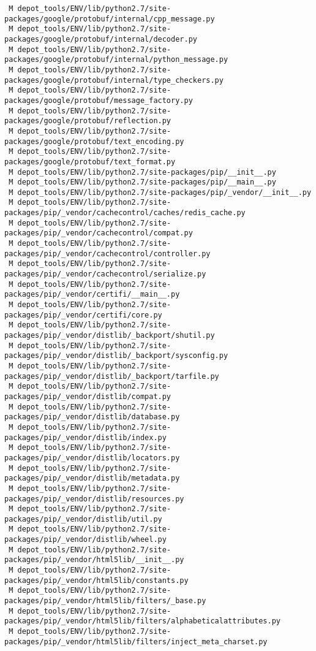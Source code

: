 \documentclass{article}
\begin{document}
\begin{verbatim}
 M depot_tools/ENV/lib/python2.7/site-packages/google/protobuf/internal/cpp_message.py
 M depot_tools/ENV/lib/python2.7/site-packages/google/protobuf/internal/decoder.py
 M depot_tools/ENV/lib/python2.7/site-packages/google/protobuf/internal/python_message.py
 M depot_tools/ENV/lib/python2.7/site-packages/google/protobuf/internal/type_checkers.py
 M depot_tools/ENV/lib/python2.7/site-packages/google/protobuf/message_factory.py
 M depot_tools/ENV/lib/python2.7/site-packages/google/protobuf/reflection.py
 M depot_tools/ENV/lib/python2.7/site-packages/google/protobuf/text_encoding.py
 M depot_tools/ENV/lib/python2.7/site-packages/google/protobuf/text_format.py
 M depot_tools/ENV/lib/python2.7/site-packages/pip/__init__.py
 M depot_tools/ENV/lib/python2.7/site-packages/pip/__main__.py
 M depot_tools/ENV/lib/python2.7/site-packages/pip/_vendor/__init__.py
 M depot_tools/ENV/lib/python2.7/site-packages/pip/_vendor/cachecontrol/caches/redis_cache.py
 M depot_tools/ENV/lib/python2.7/site-packages/pip/_vendor/cachecontrol/compat.py
 M depot_tools/ENV/lib/python2.7/site-packages/pip/_vendor/cachecontrol/controller.py
 M depot_tools/ENV/lib/python2.7/site-packages/pip/_vendor/cachecontrol/serialize.py
 M depot_tools/ENV/lib/python2.7/site-packages/pip/_vendor/certifi/__main__.py
 M depot_tools/ENV/lib/python2.7/site-packages/pip/_vendor/certifi/core.py
 M depot_tools/ENV/lib/python2.7/site-packages/pip/_vendor/distlib/_backport/shutil.py
 M depot_tools/ENV/lib/python2.7/site-packages/pip/_vendor/distlib/_backport/sysconfig.py
 M depot_tools/ENV/lib/python2.7/site-packages/pip/_vendor/distlib/_backport/tarfile.py
 M depot_tools/ENV/lib/python2.7/site-packages/pip/_vendor/distlib/compat.py
 M depot_tools/ENV/lib/python2.7/site-packages/pip/_vendor/distlib/database.py
 M depot_tools/ENV/lib/python2.7/site-packages/pip/_vendor/distlib/index.py
 M depot_tools/ENV/lib/python2.7/site-packages/pip/_vendor/distlib/locators.py
 M depot_tools/ENV/lib/python2.7/site-packages/pip/_vendor/distlib/metadata.py
 M depot_tools/ENV/lib/python2.7/site-packages/pip/_vendor/distlib/resources.py
 M depot_tools/ENV/lib/python2.7/site-packages/pip/_vendor/distlib/util.py
 M depot_tools/ENV/lib/python2.7/site-packages/pip/_vendor/distlib/wheel.py
 M depot_tools/ENV/lib/python2.7/site-packages/pip/_vendor/html5lib/__init__.py
 M depot_tools/ENV/lib/python2.7/site-packages/pip/_vendor/html5lib/constants.py
 M depot_tools/ENV/lib/python2.7/site-packages/pip/_vendor/html5lib/filters/_base.py
 M depot_tools/ENV/lib/python2.7/site-packages/pip/_vendor/html5lib/filters/alphabeticalattributes.py
 M depot_tools/ENV/lib/python2.7/site-packages/pip/_vendor/html5lib/filters/inject_meta_charset.py

\end{verbatim}
\end{document}
